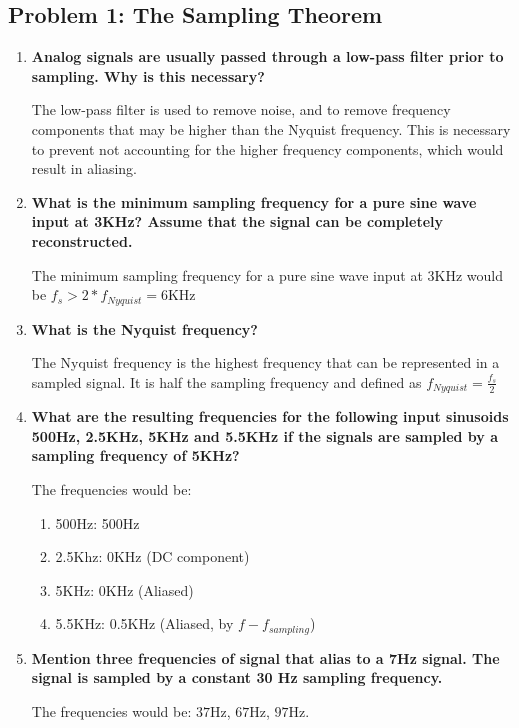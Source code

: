 \subsection{Problem 1: The Sampling Theorem}
\begin{enumerate}
      \item {\bf Analog signals are usually passed through a low-pass filter prior to sampling. Why is this necessary?}

            The low-pass filter is used to remove noise, and to remove frequency components that may be higher than the Nyquist frequency. This is necessary to prevent not accounting for the higher frequency components, which would result in aliasing.

      \item {\bf What is the minimum sampling frequency for a pure sine wave input at 3KHz? Assume that the signal can be completely reconstructed.}

            The minimum sampling frequency for a pure sine wave input at 3KHz would be $f_s > 2 * f_{Nyquist} = 6\text{KHz}$

      \item {\bf What is the Nyquist frequency?}

            The Nyquist frequency is the highest frequency that can be represented in a sampled signal. It is half the sampling frequency and defined as $f_{Nyquist} = \frac{f_s}{2}$

      \item {\bf What are the resulting frequencies for the following input sinusoids 500Hz, 2.5KHz, 5KHz and 5.5KHz if the signals are sampled by a sampling frequency of 5KHz?}

            The frequencies would be:
            \begin{enumerate}
                  \item 500Hz: 500Hz
                  \item 2.5Khz: 0KHz (DC component)
                  \item 5KHz: 0KHz (Aliased)
                  \item 5.5KHz: 0.5KHz (Aliased, by $f - f_{sampling}$)
            \end{enumerate}

      \item {\bf Mention three frequencies of signal that alias to a 7Hz signal. The signal is sampled by a constant 30 Hz sampling frequency.}

            The frequencies would be: $37$Hz, $67$Hz, $97$Hz.
\end{enumerate}

